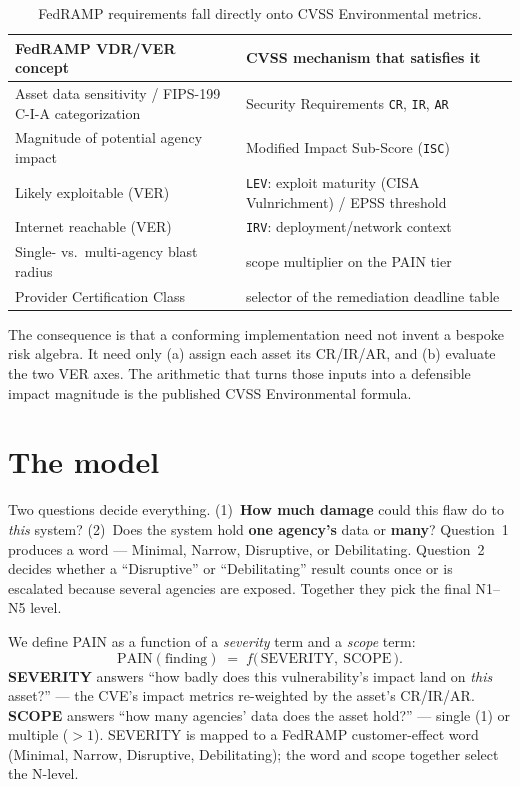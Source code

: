 \documentclass[11pt]{article}
\newcommand{\code}[1]{\texttt{#1}}
\begin{document}
\begin{table}[H]
\centering
\renewcommand{\arraystretch}{1.25}
\begin{tabular}{>{\raggedright\arraybackslash}p{} >{\raggedright\arraybackslash}p{}}
\toprule
\textbf{FedRAMP VDR/VER concept} & \textbf{CVSS mechanism that satisfies it} \\
\midrule
Asset data sensitivity / FIPS-199 C-I-A categorization & Security Requirements
\code{CR}, \code{IR}, \code{AR} \\
Magnitude of potential agency impact & Modified Impact Sub-Score (\code{ISC}) \\
Likely exploitable (VER) & \code{LEV}: exploit maturity (CISA Vulnrichment) / EPSS threshold \\
Internet reachable (VER) & \code{IRV}: deployment/network context \\
Single- vs.\ multi-agency blast radius & scope multiplier on the PAIN tier \\
Provider Certification Class & selector of the remediation deadline table \\
\bottomrule
\end{tabular}
\caption{FedRAMP requirements fall directly onto CVSS Environmental metrics.}
\end{table}

The consequence is that a conforming implementation need not invent a bespoke
risk algebra. It need only (a) assign each asset its CR/IR/AR, and (b) evaluate the
two VER axes. The arithmetic that turns those inputs into a defensible impact
magnitude is the published CVSS Environmental formula.

\section{The model}
\begin{plain}
Two questions decide everything. (1)~\textbf{How much damage} could this flaw do to
\emph{this} system? (2)~Does the system hold \textbf{one agency's} data or
\textbf{many}? Question~1 produces a word --- Minimal, Narrow, Disruptive, or
Debilitating. Question~2 decides whether a ``Disruptive'' or ``Debilitating'' result
counts once or is escalated because several agencies are exposed. Together they pick
the final N1--N5 level.
\end{plain}
We define PAIN as a function of a \emph{severity} term and a \emph{scope} term:
\[
\text{PAIN}(\text{finding}) \;=\; f\big(\,\text{SEVERITY},\ \text{SCOPE}\,\big).
\]
\textbf{SEVERITY} answers ``how badly does this vulnerability's impact land on
\emph{this} asset?'' --- the CVE's impact metrics re-weighted by the asset's
CR/IR/AR. \textbf{SCOPE} answers ``how many agencies' data does the asset hold?''
--- single (1) or multiple ($>1$). SEVERITY is mapped to a FedRAMP customer-effect
word (Minimal, Narrow, Disruptive, Debilitating); the word and scope together
select the N-level.
\end{document}
